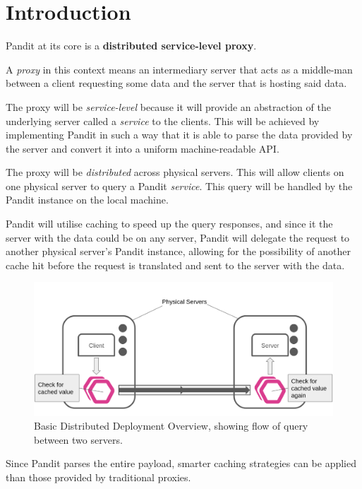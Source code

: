 \documentclass[a4paper,12pt]{report}
\begin{document}
\tableofcontents

\listoffigures


\chapter{Introduction}
Pandit at its core is a \textbf{distributed service-level proxy}.

A \textit{proxy} in this context means an intermediary server that acts as a middle-man between a client requesting some data and the server that is hosting said data.

The proxy will be \textit{service-level} because it will provide an abstraction of the underlying server called a \textit{service} to the clients. This
will be achieved by implementing Pandit in such a way that it is able to parse the data provided by the server and convert it into a uniform machine-readable API.

The proxy will be \textit{distributed} across physical servers. This will allow clients on one physical server to query a Pandit \textit{service}. 
This query will be handled by the Pandit instance on the local machine. 

Pandit will utilise caching \cite{caching} to speed up the query responses, and since it the server with the data could be on any server, Pandit will delegate the request to another physical server's Pandit instance, allowing for the possibility of another cache hit before the request is translated and sent to the server with the data.

\begin{figure}[hbt!]
    \centering
    \includegraphics[width=\linewidth]{fig1.png}
    \caption{Basic Distributed Deployment Overview, showing flow of query between two servers.}
    \label{fig:1}
\end{figure}

Since Pandit parses the entire payload, smarter caching strategies can be applied than those provided by traditional proxies.
\end{document}
